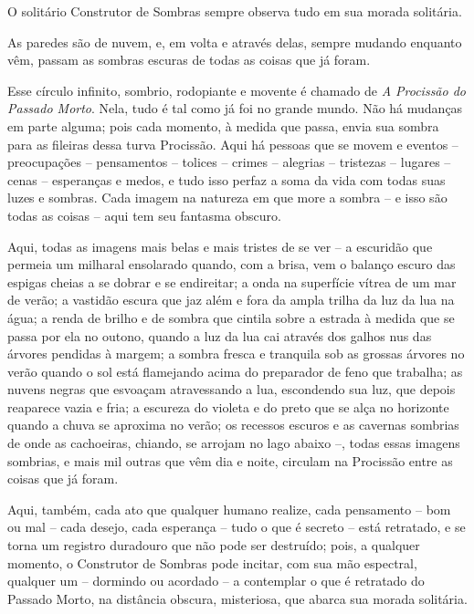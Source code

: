  

O solitário Construtor de Sombras sempre observa tudo em sua morada
solitária.

As paredes são de nuvem, e, em volta e através delas, sempre mudando
enquanto vêm, passam as sombras escuras de todas as coisas que já foram.

Esse círculo infinito, sombrio, rodopiante e movente é chamado de
\emph{A Procissão do Passado Morto}. Nela, tudo é tal como já foi no
grande mundo. Não há mudanças em parte alguma; pois cada momento, à
medida que passa, envia sua sombra para as fileiras dessa turva
Procissão. Aqui há pessoas que se movem e eventos -- preocupações --
pensamentos -- tolices -- crimes -- alegrias -- tristezas -- lugares --
cenas -- esperanças e medos, e tudo isso perfaz a soma da vida com todas
suas luzes e sombras. Cada imagem na natureza em que more a sombra -- e
isso são todas as coisas -- aqui tem seu fantasma obscuro.



Aqui, todas as imagens mais belas e mais tristes de se ver -- a
escuridão que permeia um milharal ensolarado quando, com a brisa, vem o
balanço escuro das espigas cheias a se dobrar e se endireitar; a onda na
superfície vítrea de um mar de verão; a vastidão escura que jaz além e
fora da ampla trilha da luz da lua na água; a renda de brilho e de
sombra que cintila sobre a estrada à medida que se passa por ela no
outono, quando a luz da lua cai através dos galhos nus das árvores
pendidas à margem; a sombra fresca e tranquila sob as grossas árvores no
verão quando o sol está flamejando acima do preparador de feno que
trabalha; as nuvens negras que esvoaçam atravessando a lua, escondendo
sua luz, que depois reaparece vazia e fria; a escureza do violeta e do
preto que se alça no horizonte quando a chuva se aproxima no verão; os
recessos escuros e as cavernas sombrias de onde as cachoeiras, chiando,
se arrojam no lago abaixo --, todas essas imagens sombrias, e mais mil
outras que vêm dia e noite, circulam na Procissão entre as coisas que já
foram.

Aqui, também, cada ato que qualquer humano realize, cada pensamento --
bom ou mal -- cada desejo, cada esperança -- tudo o que é secreto --
está retratado, e se torna um registro duradouro que não pode ser
destruído; pois, a qualquer momento, o Construtor de Sombras pode
incitar, com sua mão espectral, qualquer um -- dormindo ou acordado -- a
contemplar o que é retratado do Passado Morto, na distância obscura,
misteriosa, que abarca sua morada solitária.

